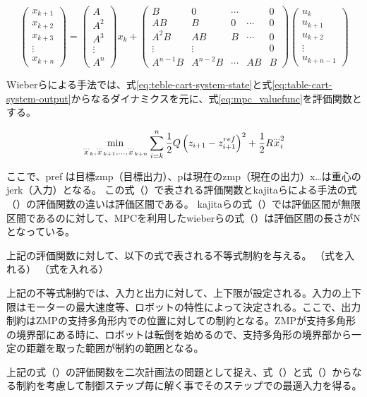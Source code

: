 \begin{equation}
  \begin{pmatrix}
  x_{k+1}\\x_{k+2}\\x_{k+3}\\
  \vdots\\ x_{k+n}
  \end{pmatrix}
  =
  \begin{pmatrix}
  A\\A^2\\A^3\\
  \vdots\\ A^n
  \end{pmatrix}
  x_{k} +
  \begin{pmatrix}
  B&0&\cdots & & 0\\
  AB & B & 0 & \cdots & 0\\
  A^2B & AB & B & \cdots & 0\\
  \vdots & \vdots & & & 0\\
  A^{n-1}B&A^{n-2}B&\cdots&AB&B
  \end{pmatrix}
  \begin{pmatrix}
  u_{k}\\
  u_{k+1}\\
  u_{k+2}\\
  \vdots\\
  u_{k+n-1}
  \end{pmatrix}
  \label{eq:mpc-preview}
\end{equation}

Wieberらによる手法\cite{WIEBER}では、式\eqref{eq:teble-cart-system-state}と式\eqref{eq:table-cart-system-output}からなるダイナミクスを元に、式\eqref{eq:mpc_valuefunc}を評価関数とする。

\begin{equation}
  \min_{{\buildrel\ldots\over{x}}_{k},{\buildrel\ldots\over{x}}_{k+1},\ldots,{\buildrel\ldots\over{x}}_{k+n}}\sum_{i=k}^{n}{1\over 2}Q\left(z_{i+1}-z_{i+1}^{ref}\right)^{2}+{1\over 2}R{\buildrel\ldots\over{x}}_{i}^{2}
  \label{eq:mpc_valuefunc}
\end{equation}

ここで、pref は目標zmp（目標出力）、pは現在のzmp（現在の出力）x…は重心のjerk（入力）となる。
この式（）で表される評価関数とkajitaらによる手法の式（）の評価関数の違いは評価区間である。
kajitaらの式（）では評価区間が無限区間であるのに対して、MPCを利用したwieberらの式（）は評価区間の長さがNとなっている。

上記の評価関数に対して、以下の式で表される不等式制約を与える。
（式を入れる）
（式を入れる）

上記の不等式制約では、入力と出力に対して、上下限が設定される。入力の上下限はモーターの最大速度等、ロボットの特性によって決定される。ここで、出力制約はZMPの支持多角形内での位置に対しての制約となる。ZMPが支持多角形の境界部にある時に、ロボットは転倒を始めるので、支持多角形の境界部から一定の距離を取った範囲が制約の範囲となる。

上記の式（）の評価関数を二次計画法の問題として捉え、式（）と式（）からなる制約を考慮して制御ステップ毎に解く事でそのステップでの最適入力を得る。